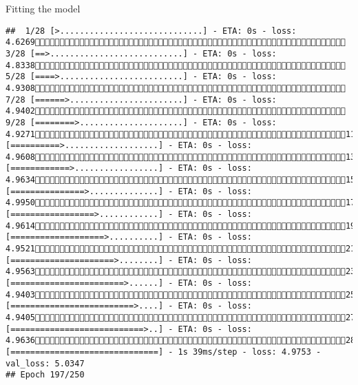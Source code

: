 \documentclass[
  ignorenonframetext,
]{beamer}
\begin{document}
\begin{frame}[fragile]{Fitting the model}
\begin{verbatim}
##  1/28 [>.............................] - ETA: 0s - loss: 4.6269 3/28 [==>...........................] - ETA: 0s - loss: 4.8338 5/28 [====>.........................] - ETA: 0s - loss: 4.9308 7/28 [======>.......................] - ETA: 0s - loss: 4.9402 9/28 [========>.....................] - ETA: 0s - loss: 4.927111/28 [==========>...................] - ETA: 0s - loss: 4.960813/28 [============>.................] - ETA: 0s - loss: 4.963415/28 [===============>..............] - ETA: 0s - loss: 4.995017/28 [=================>............] - ETA: 0s - loss: 4.961419/28 [===================>..........] - ETA: 0s - loss: 4.952121/28 [=====================>........] - ETA: 0s - loss: 4.956323/28 [=======================>......] - ETA: 0s - loss: 4.940325/28 [=========================>....] - ETA: 0s - loss: 4.940527/28 [===========================>..] - ETA: 0s - loss: 4.963628/28 [==============================] - 1s 39ms/step - loss: 4.9753 - val_loss: 5.0347
## Epoch 197/250

\end{verbatim}
\end{frame}
\end{document}
